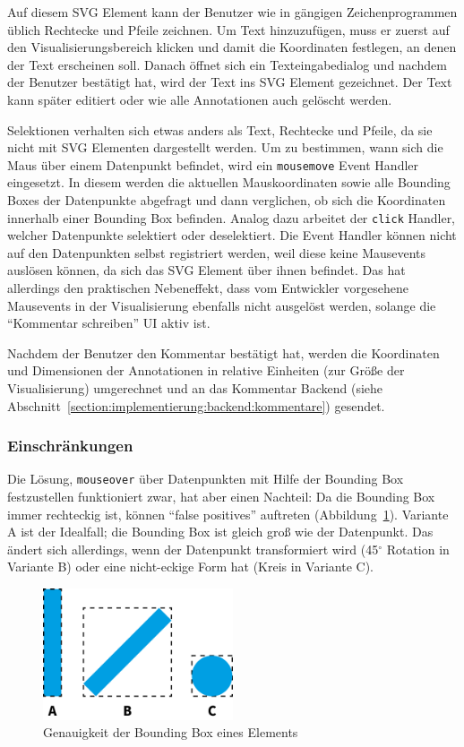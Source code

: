\documentclass[
	headsepline,
	footsepline,
	fontsize=12pt,
	bibliography=totoc
]{scrbook}
\begin{document}
Auf diesem SVG Element kann der Benutzer wie in gängigen Zeichenprogrammen üblich Rechtecke und Pfeile zeichnen. Um Text hinzuzufügen, muss er zuerst auf den Visualisierungsbereich klicken und damit die Koordinaten festlegen, an denen der Text erscheinen soll. Danach öffnet sich ein Texteingabedialog und nachdem der Benutzer bestätigt hat, wird der Text ins SVG Element gezeichnet. Der Text kann später editiert oder wie alle Annotationen auch gelöscht werden.

Selektionen verhalten sich etwas anders als Text, Rechtecke und Pfeile, da sie nicht mit SVG Elementen dargestellt werden. Um zu bestimmen, wann sich die Maus über einem Datenpunkt befindet, wird ein \texttt{mousemove} Event Handler eingesetzt. In diesem werden die aktuellen Mauskoordinaten sowie alle Bounding Boxes der Datenpunkte abgefragt und dann verglichen, ob sich die Koordinaten innerhalb einer Bounding Box befinden. Analog dazu arbeitet der \texttt{click} Handler, welcher Datenpunkte selektiert oder deselektiert. Die Event Handler können nicht auf den Datenpunkten selbst registriert werden, weil diese keine Mausevents auslösen können, da sich das SVG Element über ihnen befindet. Das hat allerdings den praktischen Nebeneffekt, dass vom Entwickler vorgesehene Mausevents in der Visualisierung ebenfalls nicht ausgelöst werden, solange die \enquote{Kommentar schreiben} UI aktiv ist.

Nachdem der Benutzer den Kommentar bestätigt hat, werden die Koordinaten und Dimensionen der Annotationen in relative Einheiten (zur Größe der Visualisierung) umgerechnet und an das Kommentar Backend (siehe Abschnitt~\ref{section:implementierung:backend:kommentare}) gesendet.

\subsubsection{Einschränkungen}

Die Lösung, \texttt{mouseover} über Datenpunkten mit Hilfe der Bounding Box festzustellen funktioniert zwar, hat aber einen Nachteil: Da die Bounding Box immer rechteckig ist, können \enquote{false positives} auftreten (Abbildung~\ref{figure:kommentar-bbox}). Variante A ist der Idealfall; die Bounding Box ist gleich groß wie der Datenpunkt. Das ändert sich allerdings, wenn der Datenpunkt transformiert wird (45$^\circ$ Rotation in Variante B) oder eine nicht-eckige Form hat (Kreis in Variante C).

\begin{figure}[htbp]
   \centering
   \includegraphics[width=0.5\textwidth]{images/implementierung-kommentar-bbox.png}
   \caption{Genauigkeit der Bounding Box eines Elements}
   \label{figure:kommentar-bbox}
\end{figure}
\end{document}
